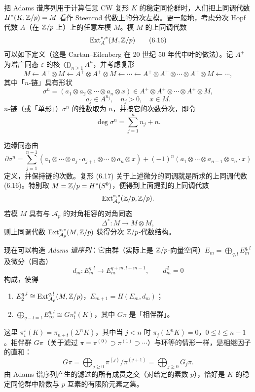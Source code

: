 把 Adams 谱序列用于计算任意 CW 复形 $K$ 的稳定同伦群时，人们把上同调代数 $H^*(K;\mathbb{Z}/p)=M$ 看作 Steenrod 代数上的分次左模。更一般地，考虑分次 Hopf 代数 $A$（在 $\mathbb{Z}/p$ 上）上的任意左模 $M$。模 $M$ 的上同调代数
\begin{equation}
\operatorname{Ext}_A^{*,*}(M,\mathbb{Z}/p) \tag{6.16}
\end{equation}
可以如下定义（这是 Cartan--Eilenberg 在 20 世纪 50 年代中叶的做法）。记 $A^+$ 为增广同态 $\varepsilon$ 的核 $\bigoplus_{n\ge1}A^n$，并考虑复形
\begin{equation}
M\leftarrow A^+\otimes M\leftarrow A^+\otimes A^+\otimes M\leftarrow\cdots\leftarrow A^+\otimes A^+\otimes\cdots\otimes A^+\otimes M\leftarrow\cdots, \tag{6.17}
\end{equation}
其中「$n$-链」具有形状
\[
\sigma^n=(a_1\otimes a_2\otimes\cdots\otimes a_n\otimes x)\in A^+\otimes A^+\otimes\cdots\otimes A^+\otimes M,
\]
\[
a_j\in A^{n_j},\quad n_j>0,\quad x\in M.
\]
$n$-链（或「单形」）$\sigma^n$ 的维数取为 $n$，并按它的次数分次，即令
\[
\deg\sigma^n=\sum_{j=1}^{n}n_j+n.
\]

边缘同态由
\[
\partial\sigma^n=\sum_{j=1}^{n-1}(a_1\otimes\cdots\otimes a_j\cdot a_{j+1}\otimes\cdots\otimes a_n\otimes x)+(-1)^n(a_1\otimes\cdots\otimes a_{n-1}\otimes a_n\cdot x)
\]
定义，并保持链的次数。复形 (6.17) 关于上述微分的同调就是所求的上同调代数 (6.16)。特别取 $M=\mathbb{Z}/p=H^*(S^0)$，便得到上面提到的上同调代数
\[
\operatorname{Ext}_{\mathcal{A}_p}^{*,*}(\mathbb{Z}/p,\mathbb{Z}/p).
\]
若模 $M$ 具有与 $\mathcal{A}_p$ 的对角相容的对角同态
\[
\Delta^*:M\longrightarrow M\otimes M,
\]
则上同调代数 $\operatorname{Ext}_{\mathcal{A}_p}^{*,*}(M,\mathbb{Z}/p)$ 获得分次 $\mathbb{Z}/p$-代数结构。

现在可以构造 \emph{Adams 谱序列}：它由群（实际上是 $\mathbb{Z}/p$-向量空间）$E_m=\bigoplus_{q,l}E_m^{q,l}$ 及微分（同态）
\[
d_m:E_m^{q,l}\longrightarrow E_m^{q+m,l+m-1},\qquad d_m^2=0
\]
构成，使得
\begin{enumerate}[label=(\roman*),leftmargin=2.2em]
\item $E_2^{q,l}\cong\operatorname{Ext}_{\mathcal{A}_p}^{q,l}(M,\mathbb{Z}/p)$，$E_{m+1}=H(E_m,d_m)$；
\item $\bigoplus\limits_{q-l=t}E_\infty^{q,l}\cong G\pi_t^s(K)$，其中 $G\pi$ 是「相伴群」。
\end{enumerate}
这里 $\pi_t^s(K)=\pi_{n+t}(\Sigma^nK)$，其中当 $j<n$ 时 $\pi_j(\Sigma^nK)=0$，$0\le t\le n-1$。相伴群 $G\pi$（关于滤过 $\pi=\pi^{(0)}\supset\pi^{(1)}\supset\cdots$）与环等的情形一样，是相继因子的直和：
\[
G\pi=\bigoplus_{j\ge0}\pi^{(j)}/\pi^{(j+1)}=\bigoplus_{j\ge0}G_j\pi.
\]
由 Adams 谱序列产生的滤过的所有成员之交（对给定的素数 $p$），恰好是 $K$ 的稳定同伦群中阶数与 $p$ 互素的有限阶元素之集。

